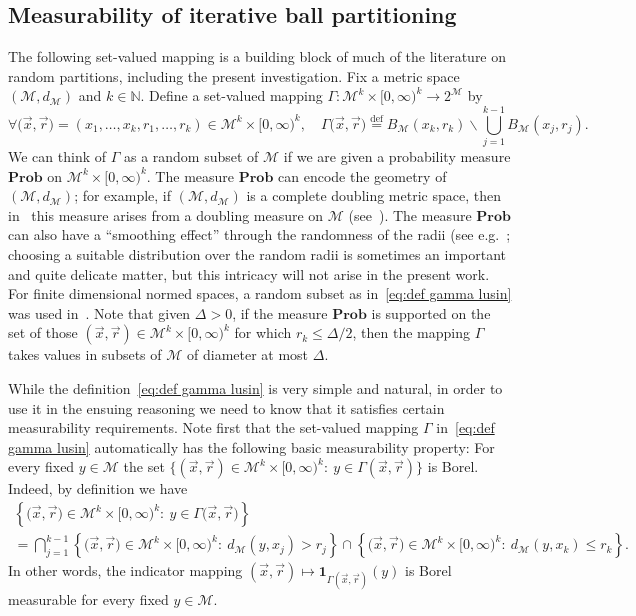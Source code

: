 \documentclass[11pt,reqno]{amsart}
\renewcommand{\le}{\leqslant}
\renewcommand{\setminus}{\smallsetminus}
\theoremstyle{remark}
\newcommand{\MM}{\mathcal{M}}
\newcommand{\N}{\mathbb N}
\newcommand{\eqdef}{\stackrel{\mathrm{def}}{=}}
\renewcommand{\Pr}{\mathbf{Prob}}
\renewcommand{\1}{\mathbf 1}
\begin{document}
\subsection{Measurability of iterative ball partitioning}\label{sec:iterative meas} The following set-valued mapping is a building block of much of the literature on random partitions, including the present investigation. Fix a metric space $(\MM,d_\MM)$ and $k\in \N$. Define a set-valued mapping $\Gamma:{\MM}^k\times [0,\infty)^k\to 2^{\MM}$ by
\begin{equation}\label{eq:def gamma lusin}
\forall \big(\vec{x},\vec{r}\big)=(x_1,\ldots,x_k,r_1,\ldots,r_k)\in {\MM}^k\times [0,\infty)^k,\quad  \Gamma\big(\vec{x},\vec{r}\big)\eqdef B_{\MM}(x_k,r_k)\setminus \bigcup_{j=1}^{k-1} B_{\MM}(x_j,r_j).
\end{equation}
We can think of $\Gamma$ as a random subset of $\MM$ if we are given a probability measure $\Pr$ on ${\MM}^k\times [0,\infty)^k$. The measure $\Pr$ can encode  the geometry of $(\MM,d_\MM)$; for example, if $(\MM,d_\MM)$ is a complete doubling metric space, then in~\cite{LN05} this measure arises from a doubling measure on $\MM$ (see~\cite{VK87,LS98}). The measure $\Pr$ can also have a ``smoothing effect'' through the randomness of the radii (see e.g.~\cite{Bar98,CKR04,FRT04,LN05,MN07,NT10,ABN11,NT12}; choosing a suitable distribution over the random radii is sometimes an important and quite delicate matter, but this intricacy will not arise in the present work. For  finite dimensional normed spaces, a random subset as in~\eqref{eq:def gamma lusin} was used in~\cite{CCGGP98,KMS98}. Note that given $\Delta>0$, if the measure $\Pr$ is supported on the set of those $(\vec{x},\vec{r})\in {\MM}^k\times [0,\infty)^k$ for which $r_k\le \Delta/2$, then the mapping $\Gamma$  takes values in subsets of $\MM$ of diameter at most $\Delta$.

While the definition~\eqref{eq:def gamma lusin} is very simple and natural, in order to use it in the ensuing reasoning we need to know that it satisfies certain  measurability requirements. Note first that the set-valued mapping $\Gamma$ in~\eqref{eq:def gamma lusin} automatically has the following basic measurability property: For every fixed $y\in \MM$ the set $\{(\vec{x},\vec{r})\in \MM^k\times [0,\infty)^k:\ y\in \Gamma(\vec{x},\vec{r})\}$ is Borel. Indeed, by definition we have
\begin{multline*}
\left\{\big(\vec{x},\vec{r}\big)\in \MM^k\times [0,\infty)^k:\ y\in \Gamma\big(\vec{x},\vec{r}\big)\right\}\\=
\bigcap_{j=1}^{k-1} \left\{\big(\vec{x},\vec{r}\big)\in \MM^k\times [0,\infty)^k:\ d_\MM(y,x_j)>r_j\right\}\cap \left\{\big(\vec{x},\vec{r}\big)\in \MM^k\times [0,\infty)^k:\ d_\MM(y,x_k)\le r_k\right\}.
\end{multline*}
In other words, the indicator mapping $(\vec{x},\vec{r})\mapsto \1_{\Gamma(\vec{x},\vec{r})}(y)$ is Borel measurable for every fixed $y\in \MM$.
\end{document}

